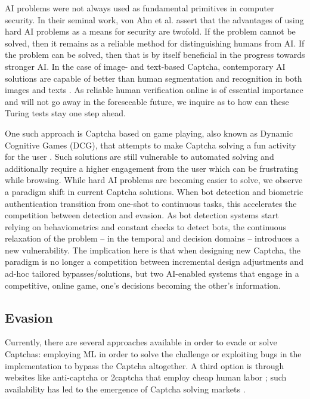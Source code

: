 AI problems were not always used as fundamental primitives in computer security.
In their seminal work, von Ahn et al. \cite{von2003captcha} assert that the advantages of using hard AI problems as a means for security are twofold.
If the problem cannot be solved, then it remains as a reliable method for distinguishing humans from AI.
If the problem can be solved, then that is by itself beneficial in the progress towards stronger AI.
In the case of image- and text-based Captcha, contemporary AI solutions are capable of better than human segmentation and recognition in both images and texts \cite{bursztein2014end, sivakorn2016robot, karpathy2015deep}.
As reliable human verification online is of essential importance and will not go away in the foreseeable future, we inquire as to how can these Turing tests stay one step ahead.

One such approach is Captcha based on game playing, also known as Dynamic Cognitive Games (DCG), that attempts to make Captcha solving a fun activity for the user \cite{mohamed2014three}.
Such solutions are still vulnerable to automated solving and additionally require a higher engagement from the user which can be frustrating while browsing.
While hard AI problems are becoming easier to solve, we observe a paradigm shift in current Captcha solutions. 
When bot detection \cite{d2014avatar} and biometric authentication \cite{fridman2015multi} transition from one-shot to continuous tasks, this accelerates the competition between detection and evasion.
As bot detection systems start relying on behaviometrics and constant checks to detect bots, the continuous relaxation of the problem -- in the temporal and decision domains -- introduces a new vulnerability.
The implication here is that when designing new Captcha, the paradigm is no longer a competition between incremental design adjustments and ad-hoc tailored bypasses/solutions, but two AI-enabled systems that engage in a competitive, online game, one's decisions becoming the other's information.

\subsection{Evasion}

Currently, there are several approaches available in order to evade or solve Captchas: employing \gls{ML} in order to solve the challenge or exploiting bugs in the implementation to bypass the Captcha altogether.
A third option is through websites like anti-captcha or 2captcha that employ cheap human labor \cite{weng2019towards}; such availability has led to the emergence of Captcha solving markets \cite{motoyama2010re}.

